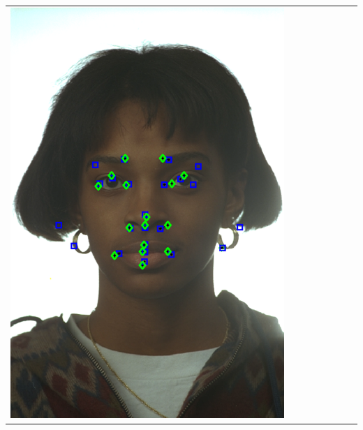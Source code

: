 \documentclass[landscape,final,a0paper,fontscale=0.27065]{baposter}
\begin{document}
\begin{poster}
{{\begin{tabular}{@{}rccccccc@{}}
 \parbox[c]{0.11\linewidth}{\includegraphics[width=\linewidth]{images/l_fa_fail.pdf}} &

\end{tabular}}}
\end{poster}
\end{document}
